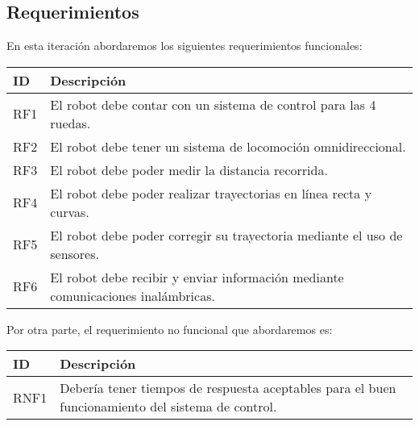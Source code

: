 \subsection{Requerimientos}

En esta iteración abordaremos los siguientes requerimientos funcionales:

\begin{center} 
    \begin{tabular} {
        | >{\centering\arraybackslash}m{1cm}
        | >{\centering\arraybackslash}m{13cm} |}
        \hline \rowcolor{test_header_color}
            ID & Descripción \\
        \hline
            RF1 & El robot debe contar con un sistema de control para las 4 ruedas. \\
        \hline
            RF2 & El robot debe tener un sistema de locomoción omnidireccional. \\
        \hline
            RF3 & El robot debe poder medir la distancia recorrida. \\
        \hline
            RF4 & El robot debe poder realizar trayectorias en línea recta y curvas. \\
        \hline
            RF5 & El robot debe poder corregir su trayectoria mediante el uso de sensores. \\
        \hline
            RF6 & El robot debe recibir y enviar información mediante comunicaciones inalámbricas. \\
        \hline
    \end{tabular}
\end{center}
  
   Por otra parte, el requerimiento no funcional que abordaremos es:
  
\begin{center}
    \begin{tabular} {
        | >{\centering\arraybackslash}m{1cm}
        | >{\centering\arraybackslash}m{13cm} |}
        \hline \rowcolor{test_header_color}
        ID & Descripción \\
        \hline
        RNF1 & Debería tener tiempos de respuesta aceptables para el buen funcionamiento del sistema de control. \\
        \hline
    \end{tabular}
\end{center}